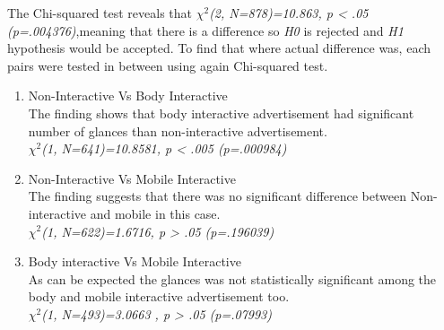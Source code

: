 \begin{table}[H]
\caption{Cross tabulation for each week attention level }
\label{tab:crosstabulationweeks}
\centering
{}
\end{table}


The Chi-squared test reveals that ${\chi}^2$\emph{(2, N=878)=10.863, p < .05 (p=.004376)},meaning that there is a difference so \emph{H0} is rejected and \emph{H1} hypothesis would be accepted.
To find that where actual difference was, each pairs were tested in between using again Chi-squared test.

\begin{enumerate}
\item Non-Interactive Vs Body Interactive \\
The finding shows that body interactive advertisement had significant number of glances than non-interactive advertisement. \\
${\chi}^2$\emph{(1, N=641)=10.8581, p < .005 (p=.000984)}

\item Non-Interactive Vs Mobile Interactive  \\
The finding suggests that there was no significant difference between Non-interactive and mobile in this case.\\
${\chi}^2$\emph{(1, N=622)=1.6716, p > .05 (p=.196039)}

\item Body interactive Vs Mobile Interactive \\
As can be expected the glances was not statistically significant among the body and mobile interactive advertisement too.\\
${\chi}^2$\emph{(1, N=493)=3.0663 , p > .05 (p=.07993)}

\end{enumerate}


